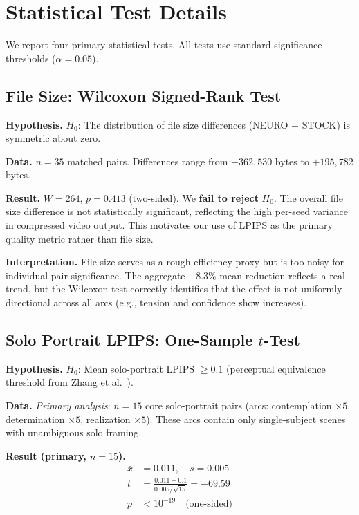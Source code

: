 \documentclass[10pt,twocolumn,letterpaper]{article}
\begin{document}
\section{Statistical Test Details}
\label{sec:stats}

We report four primary statistical tests. All tests use standard significance thresholds ($\alpha = 0.05$).

\subsection{File Size: Wilcoxon Signed-Rank Test}

\textbf{Hypothesis.} $H_0$: The distribution of file size differences (NEURO $-$ STOCK) is symmetric about zero.

\textbf{Data.} $n = 35$ matched pairs. Differences range from $-362{,}530$ bytes to $+195{,}782$ bytes.

\textbf{Result.} $W = 264$, $p = 0.413$ (two-sided). We \textbf{fail to reject} $H_0$. The overall file size difference is not statistically significant, reflecting the high per-seed variance in compressed video output. This motivates our use of LPIPS as the primary quality metric rather than file size.

\textbf{Interpretation.} File size serves as a rough efficiency proxy but is too noisy for individual-pair significance. The aggregate $-$8.3\% mean reduction reflects a real trend, but the Wilcoxon test correctly identifies that the effect is not uniformly directional across all arcs (e.g., tension and confidence show increases).

\subsection{Solo Portrait LPIPS: One-Sample $t$-Test}

\textbf{Hypothesis.} $H_0$: Mean solo-portrait LPIPS $\geq 0.1$ (perceptual equivalence threshold from Zhang et al.~\cite{zhang2018}).

\textbf{Data.} \textit{Primary analysis}: $n = 15$ core solo-portrait pairs (arcs: contemplation $\times 5$, determination $\times 5$, realization $\times 5$). These arcs contain only single-subject scenes with unambiguous solo framing.

\textbf{Result (primary, $n = 15$).}
\begin{align}
\bar{x} &= 0.011, \quad s = 0.005 \nonumber \\
t &= \frac{0.011 - 0.1}{0.005 / \sqrt{15}} = -69.59 \nonumber \\
p &< 10^{-19} \quad \text{(one-sided)}
\end{align}
\end{document}
